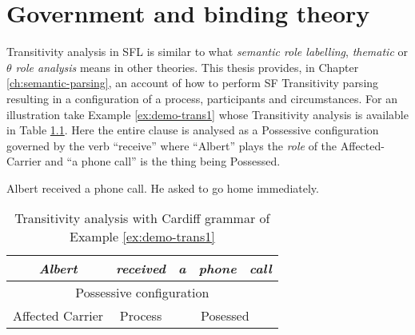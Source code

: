 \chapter{Government and binding theory}
\label{ch:gbt}



Transitivity analysis in SFL is similar to what \textit{semantic role labelling}, \textit{thematic}  or  \textit{$\theta$ role analysis} means in other theories. This thesis provides, in Chapter \ref{ch:semantic-parsing}, an account of how to perform SF Transitivity parsing resulting in a configuration of a process, participants and circumstances. For an illustration take Example \ref{ex:demo-trans1} whose Transitivity analysis is available in Table \ref{tab:demo-trans1}. Here the entire clause is analysed as a Possessive configuration governed by the verb ``receive'' where ``Albert'' plays the \textit{role} of the Affected-Carrier and ``a phone call'' is the thing being Possessed.

\begin{exe}
    \ex\label{ex:demo-trans1} Albert received a phone call.
    \ex\label{ex:demo-trans2} He asked to go home immediately.
\end{exe}

\begin{table}[!ht]
    \centering
    \begin{tabular}{|c|c|c|c|c|}
        \hline
        \textit{Albert}  & \textit{received} & \textit{a} & \textit{phone} & \textit{call} \\ \hline
        \multicolumn{5}{|c|}{Possessive configuration}                                     \\ \hline
        Affected Carrier & Process           & \multicolumn{3}{c|}{Posessed}               \\ \hline
    \end{tabular}
    \caption{Transitivity analysis with Cardiff grammar of Example \ref{ex:demo-trans1}}
    \label{tab:demo-trans1}
\end{table}

